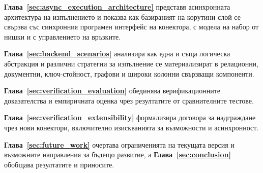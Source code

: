 \textbf{Глава~\ref{sec:async_execution_architecture}} представя асинхронната архитектура на изпълнението и показва как базираният на корутини слой се свързва със синхронния програмен интерфейс на конектора, с модела на набор от нишки и с управлението на връзките.

\textbf{Глава~\ref{sec:backend_scenarios}} анализира как една и съща логическа абстракция и различни стратегии за изпълнение се материализират в релационни, документни, ключ-стойност, графови и широки колонни свързващи компоненти.

\textbf{Глава~\ref{sec:verification_evaluation}} обединява верификационните доказателства и емпиричната оценка чрез резултатите от сравнителните тестове.

\textbf{Глава~\ref{sec:verification_extensibility}} формализира договора за надграждане чрез нови конектори, включително изискванията за възможности и асинхронност.

\textbf{Глава~\ref{sec:future_work}} очертава ограниченията на текущата версия и възможните направления за бъдещо развитие, а \textbf{Глава~\ref{sec:conclusion}} обобщава резултатите и приносите.

